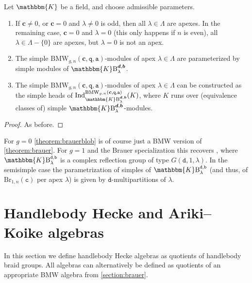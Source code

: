 \documentclass[a4paper,11pt]{amsart}
\newcommand{\setstuff}[1]{\mathrm{#1}}
\newcommand{\KK}{\mathbbm{K}}
\newcommand{\bsym}[1]{\boldsymbol{#1}}
\newcommand{\varsym}[1]{\mathtt{#1}}
\newcommand{\qvar}{\varsym{q}}
\newcommand{\cpar}{\bsym{c}}
\newcommand{\cvar}{\varsym{c}}
\newcommand{\bpar}{\bsym{b}}
\newcommand{\bvar}{\varsym{b}}
\newcommand{\dpar}{\bsym{d}}
\newcommand{\dvar}{\varsym{d}}
\newcommand{\avar}{\varsym{a}}
\numberwithin{equation}{section}
\let\fullref\autoref
\begin{document}
\begin{theorem}\label{theorem:brauerblob}
Let $\KK$ be a field, and choose admissible parameters.
\begin{enumerate}

\item If $\cpar\neq 0$, or $\cpar=0$ and $\lambda\neq 0$ is odd, 
then all $\lambda\in\Lambda$ are apexes. In the remaining case, 
$\cpar=0$ and $\lambda=0$ (this only happens if $n$ is even), all $\lambda\in\Lambda-\{0\}$ are apexes, but $\lambda=0$ is not an apex.

\item The simple $\setstuff{BMW}_{g,n}(\cpar,\qvar,\avar)$-modules of 
apex $\lambda\in\Lambda$ 
are parameterized by simple modules of $\KK\setstuff{B}_{\lambda}^{\dpar,\bpar}$.

\item The simple $\setstuff{BMW}_{g,n}(\cpar,\qvar,\avar)$-modules of 
apex $\lambda\in\Lambda$ can be constructed as 
the simple heads of
$\mathrm{Ind}_{\KK\setstuff{B}_{\lambda}^{\dpar,\bpar}}^{\setstuff{BMW}_{g,n}(\cpar,\qvar,\avar)}(K)$, 
where $K$ runs over (equivalence classes of) 
simple $\KK\setstuff{B}_{\lambda}^{\dpar,\bpar}$-modules.

\end{enumerate}
\end{theorem}

\begin{proof}
As before.
\end{proof}

\begin{example}
For $g=0$ \fullref{theorem:brauerblob} is 
of course just a BMW version of
\fullref{theorem:brauer}. For $g=1$ and the Brauer 
specialization this recovers 
\cite[Appendix 6]{BoCoDeVi-decomposition-cyclotomic-brauer}, where 
$\KK\setstuff{B}_{\lambda}^{\dvar,\bvar}$ is a complex reflection 
group of type $G(\dvar,1,\lambda)$.
In the semisimple case the parametrization of simples of
$\KK\setstuff{B}_{\lambda}^{\dvar,\bvar}$ (and thus, of $\setstuff{Br}_{1,n}(\cvar)$ per apex $\lambda$) is given 
by $\dvar$-multipartitions of $\lambda$. 
\end{example}

\section{Handlebody Hecke and Ariki--Koike algebras}\label{section:hecke}

In this section we define handlebody Hecke algebras as quotients of handlebody braid groups.  
All algebras can alternatively be defined as quotients of an appropriate
BMW algebra from \fullref{section:brauer}. 
\end{document}
